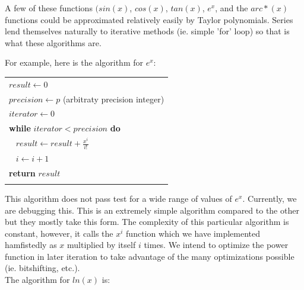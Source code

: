 \documentclass[a4paper, 12pt]{article}
\begin{document}
A few of these functions $(sin(x)$, $cos(x)$, $tan(x)$, $e^x$, and the $arc*(x)$ functions could be approximated relatively easily by Taylor polynomials. Series lend themselves naturally to iterative methods (ie. simple 'for' loop) so that is what these algorithms are.
\bigskip

For example, here is the algorithm for $e^x$:

\begin{center}
\begin{tabular}{l}
$result\leftarrow 0$ \\

$precision\leftarrow p$ (arbitraty precision integer) \\

\medskip
$iterator\leftarrow 0$ \\

\textbf{while} $iterator < precision$ \textbf{do} \\

$\;\;\;result\leftarrow result + \frac{x^i}{i!}$ \\

\medskip
$\;\;\;i\leftarrow i + 1$ \\

\textbf{return} $result$ \\ \\

\end{tabular}
\end{center}

This algorithm does not pass test for a wide range of values of $e^x$. Currently, we are debugging this. This is an extremely simple algorithm compared to the other but they mostly take this form. The complexity of this particular algorithm is constant, however, it calls the $x^i$ function which we have implemented hamfistedly as $x$ multiplied by itself $i$ times. We intend to optimize the power function in later iteration to take advantage of the many optimizations possible (ie. bitshifting, etc.). \\

The algorithm for $ln(x)$ is:
\end{document}
